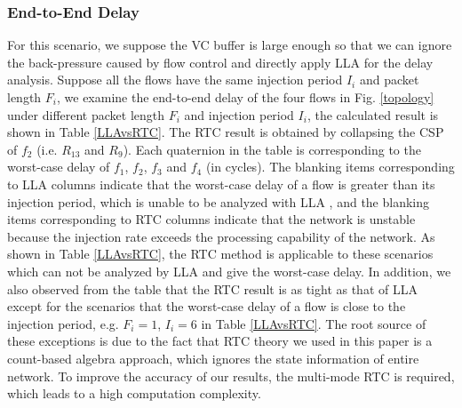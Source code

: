 \documentclass[10pt,journal]{IEEEtran}
\begin{document}
\subsubsection{End-to-End Delay}
For this scenario, we suppose the VC buffer is large enough so that we can ignore the back-pressure caused by flow control and directly apply LLA for the delay analysis. Suppose all the flows have the same injection period $I_i$ and packet length $F_i$, we examine the end-to-end delay of the four flows in Fig. \ref{topology} under different packet length $F_i$ and injection period $I_i$, the calculated result is shown in Table \ref{LLAvsRTC}. The RTC result is obtained by collapsing the CSP of $f_2$ (i.e. $R_{13}$ and $R_{9}$). Each quaternion in the table is corresponding to the worst-case delay of $f_1$, $f_2$, $f_3$ and $f_4$ (in cycles). The blanking items corresponding to LLA columns indicate that the worst-case delay of a flow is greater than its injection period, which is unable to be analyzed with LLA \cite{73}\cite{189}, and the blanking items corresponding to RTC columns indicate that the network is unstable because the injection rate exceeds the processing capability of the network. As shown in Table \ref{LLAvsRTC}, the RTC method is applicable to these scenarios which can not be analyzed by LLA and give the worst-case delay. In addition, we also observed from the table that the RTC result is as tight as that of LLA except for the scenarios that the worst-case delay of a flow is close to the injection period, e.g. $F_i=1$, $I_i=6$ in Table \ref{LLAvsRTC}. The root source of these exceptions is due to the fact that RTC theory we used in this paper is a count-based algebra approach, which ignores the state information of entire network. To improve the accuracy of our results, the multi-mode RTC \cite{Phan2008MultiMode} is required, which leads to a high computation complexity.
\end{document}
